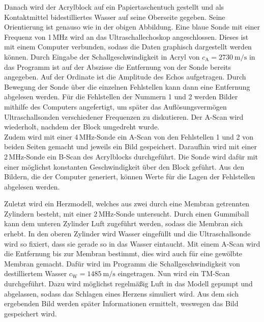 Danach wird der Acrylblock auf ein Papiertaschentuch gestellt und als Kontaktmittel
bidestilliertes Wasser auf seine Oberseite gegeben. Seine Orientierung ist genauso wie in
der obigen Abbildung. Eine blaue Sonde mit einer Frequenz von 1\,MHz wird an das
Ultraschallechoskop angeschlossen. Dieses ist mit einem Computer verbunden, sodass
die Daten graphisch dargestellt werden können. Durch Eingabe der Schallgeschwindigkeit
in Acryl von $c_\text{A} = \SI{2730}{\meter\per\second}$ \cite{acryl} in das Programm ist auf der Abszisse die
Entfernung von der Sonde bereits angegeben. Auf der Ordinate ist die Amplitude des Echos
aufgetragen. Durch Bewegung der Sonde über die einzelnen Fehlstellen kann dann eine
Entfernung abgelesen werden. Für die Fehlstellen der Nummern 1 und 2 werden Bilder mithilfe
des Computers angefertigt, um später das Auflösungsvermögen Ultraschallsonden verschiedener
Frequenzen zu diskutieren. Der A-Scan wird wiederholt, nachdem der Block umgedreht wurde.\\
Zudem wird mit einer 4\,MHz-Sonde ein A-Scan von den Fehlstellen 1 und 2 von beiden Seiten
gemacht und jeweils ein Bild gespeichert.
Daraufhin wird mit einer 2\,MHz-Sonde ein B-Scan des Acrylblocks durchgeführt. Die Sonde wird dafür mit einer
möglichst konstanten Geschwindigkeit über den Block geführt. Aus den Bildern, die
der Computer generiert, können Werte für die Lagen der Fehlstellen abgelesen werden.

Zuletzt wird ein Herzmodell, welches aus zwei durch eine Membran getrennten Zylindern
besteht, mit einer 2\,MHz-Sonde untersucht. Durch einen Gummiball kann dem unteren Zylinder Luft zugeführt werden, sodass die Membran
sich erhebt. In den oberen Zylinder wird Wasser eingefüllt und die Ultraschallsonde
wird so fixiert, dass sie gerade so in das Wasser eintaucht. Mit einem A-Scan wird die
Entfernung bis zur Membran bestimmt, dies wird auch für eine gewölbte Membran gemacht.
Dafür wird im Programm die Schallgeschwindigkeit von destilliertem Wasser
$c_\text{W}=\SI{1485}{\meter\per\second}$ \cite{wasser} eingetragen.
Nun wird ein TM-Scan durchgeführt. Dazu wird möglichst regelmäßig Luft in das Modell
gepumpt und abgelassen, sodass das Schlagen eines Herzens simuliert wird. Aus dem
sich ergebenden Bild werden später Informationen ermittelt, weswegen das Bild gespeichert wird.
